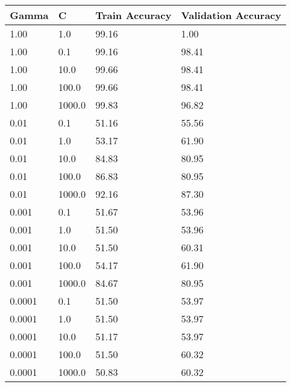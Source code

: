 \def\arraystretch{1.25}
\begin{center}
\begin{longtable}{l l l l}
\hline
\hline
\textbf{Gamma} & \textbf{C} & \textbf{Train Accuracy}  & \textbf{Validation Accuracy}\\
\hline
\hline
1.00 & 1.0 & 99.16 & 1.00\\
1.00 & 0.1 & 99.16 & 98.41 \\
1.00 & 10.0 & 99.66 & 98.41 \\
1.00 & 100.0 & 99.66 & 98.41 \\
1.00 & 1000.0 & 99.83 & 96.82 \\
0.01 & 0.1 & 51.16 & 55.56 \\
0.01 & 1.0 & 53.17 & 61.90 \\
0.01 & 10.0 & 84.83 & 80.95 \\
0.01 & 100.0 & 86.83 & 80.95 \\
0.01 & 1000.0 & 92.16 & 87.30 \\
0.001 & 0.1 & 51.67 & 53.96 \\
0.001 & 1.0 & 51.50 & 53.96 \\
0.001 & 10.0 & 51.50 & 60.31 \\
0.001 & 100.0 & 54.17 & 61.90 \\
0.001 & 1000.0 & 84.67 & 80.95\\
0.0001 & 0.1 & 51.50 & 53.97 \\
0.0001 & 1.0 & 51.50 & 53.97 \\
0.0001 & 10.0 & 51.17 & 53.97 \\
0.0001 & 100.0 & 51.50 & 60.32 \\
0.0001 & 1000.0 & 50.83 & 60.32 \\
\hline
\end{longtable}
\setcounter{table}{2}
\end{center}